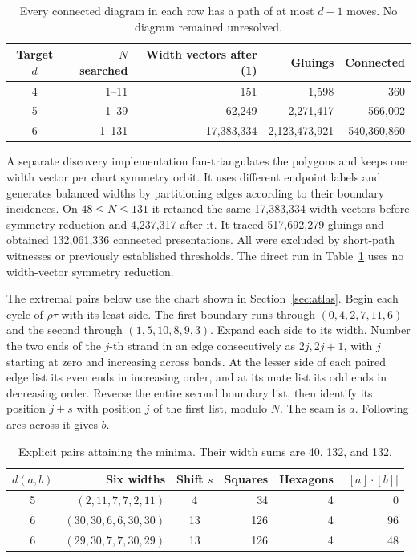 \documentclass[11pt,a4paper]{article}
\begin{document}
\begin{table}[h]\centering
\begin{tabular}{@{}crrrr@{}}\toprule
Target \(d\)&\(N\) searched&Width vectors after (1)&Gluings&Connected\\\midrule
4&1--11&151&1,598&360\\
5&1--39&62,249&2,271,417&566,002\\
6&1--131&17,383,334&2,123,473,921&540,360,860\\\bottomrule
\end{tabular}
\caption{Every connected diagram in each row has a path of at most \(d-1\) moves.
No diagram remained unresolved.}\label{tab:census}
\end{table}

A separate discovery implementation fan-triangulates the polygons and keeps
one width vector per chart symmetry orbit. It uses different endpoint labels
and generates balanced widths by partitioning edges according to their boundary
incidences. On \(48\le N\le131\) it retained the same 17,383,334 width vectors
before symmetry reduction and 4,237,317 after it. It traced 517,692,279 gluings
and obtained 132,061,336 connected presentations. All were excluded by
short-path witnesses or previously established thresholds. The direct run in
Table~\ref{tab:census} uses no width-vector symmetry reduction.

The extremal pairs below use the chart shown in Section~\ref{sec:atlas}. Begin each
cycle of \(\rho\tau\) with its least side. The first boundary runs through
\((0,4,2,7,11,6)\) and the second through \((1,5,10,8,9,3)\). Expand each side
to its width. Number the two ends of the \(j\)-th strand in an edge consecutively
as \(2j,2j+1\), with \(j\) starting at zero and increasing across bands.
At the lesser side of each paired edge list its even ends in increasing order,
and at its mate list its odd ends in decreasing order. Reverse the entire second
boundary list, then identify its position \(j+s\) with position \(j\) of
the first list, modulo \(N\). The seam is \(a\). Following arcs across it gives \(b\).

\begin{table}[h]\centering
\begin{tabular}{@{}crcrrr@{}}\toprule
\(d(a,b)\)& Six widths & Shift \(s\) & Squares & Hexagons & \(|[a]\cdot[b]|\)\\\midrule
5 & \((2,11,7,7,2,11)\)&4&34&4&0\\
6 & \((30,30,6,6,30,30)\)&13&126&4&96\\
6 & \((29,30,7,7,30,29)\)&13&126&4&48\\\bottomrule
\end{tabular}
\caption{Explicit pairs attaining the minima. Their width sums are 40, 132, and 132.}\label{tab:examples}
\end{table}
\end{document}
